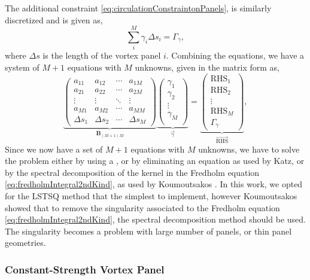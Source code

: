 The additional constraint \ref{eq:circulationConstraintonPanels}, is similarly discretized and is given as,
	\begin{equation}
	\sum_{i}^{M} \gamma_i\Delta s_i = \Gamma_{\gamma},
	\label{eq:la_circualtionConstr}
	\end{equation}	
where $\Delta s$ is the length of the vortex panel $i$. Combining the equations, we have a system of $M+1$ equations with $M$ unknowns, given in the matrix form as,
	\begin{equation}
	\underbrace{\begin{pmatrix}
	 a_{11} & a_{12} & \cdots & a_{1M}\\ 
	a_{21} &  a_{22} & \cdots & a_{2M}\\
	\vdots & \vdots & \ddots & \vdots\\ 
	a_{M1} & a_{M2} & \cdots &  a_{MM}\\
	\Delta s_1 & \Delta s_2 & \cdots & \Delta s_M
	\end{pmatrix}}_{\mathbf{B}_{\left(M+1\right)M}} \underbrace{\begin{pmatrix}
	\gamma_{1}\\ \gamma_{2}\\
	\vdots\\
	\gamma_M\\
	\end{pmatrix}}_{\vec{\gamma}} = \underbrace{\begin{pmatrix}
	\mathrm{RHS}_1\\ 
	\mathrm{RHS}_2\\ 
	\vdots\\
	\mathrm{RHS}_M\\
	\Gamma_{\gamma}
	\end{pmatrix}}_{\overrightarrow{\mathrm{RHS}}},
	\end{equation}
Since we now have a set of $M+1$ equations with $M$ unknowns, we have to solve the problem either by using a , or by eliminating an equation as used by Katz, or by the spectral decomposition of the kernel in the Fredholm equation \ref{eq:fredholmIntegral2ndKind}, as used by Koumoutsakos \cite{Cottet2000a}. In this work, we opted for the LSTSQ method that the simplest to implement, however Koumoutsakos showed that to remove the singularity associated to the Fredholm equation \ref{eq:fredholmIntegral2ndKind}, the spectral decomposition method should be used. The singularity becomes a problem with large number of panels, or thin panel geometries.

\subsubsection{Constant-Strength Vortex Panel}

